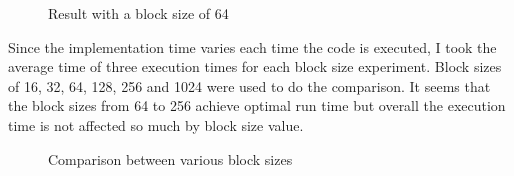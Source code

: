 \documentclass{article}
\begin{document}
\begin{figure}[H]
    \caption{Result with a block size of 64}
\end{figure}

Since the implementation time varies each time the code is executed, I took the average time of three execution times for each block size experiment. Block sizes of 16, 32, 64, 128, 256 and 1024 were used to do the comparison. It seems that the block sizes from 64 to 256 achieve optimal run time but overall the execution time is not affected so much by block size value.

\begin{figure}[H]
    \caption{Comparison between various block sizes}
\end{figure}
\end{document}
